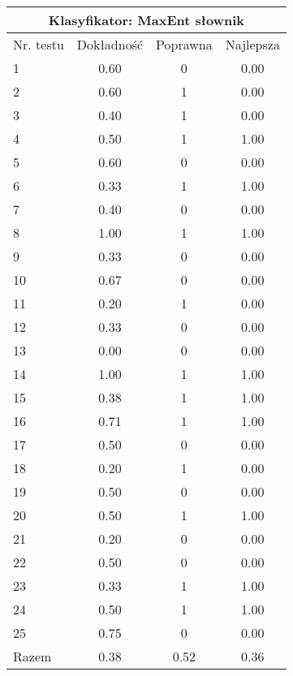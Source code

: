 \documentclass[notitlepage,leqno,fleqn,a4paper]{article}
\begin{document}
\begin{tabular}{|l|c|c|c|}
\hline
\multicolumn{4}{|c|}{Klasyfikator: MaxEnt słownik}\\
\hline
Nr. testu & Dokładność & Poprawna & Najlepsza\\
\hline
1 & 0.60 & 0 & 0.00 \\
2 & 0.60 & 1 & 0.00 \\
3 & 0.40 & 1 & 0.00 \\
4 & 0.50 & 1 & 1.00 \\
5 & 0.60 & 0 & 0.00 \\
6 & 0.33 & 1 & 1.00 \\
7 & 0.40 & 0 & 0.00 \\
8 & 1.00 & 1 & 1.00 \\
9 & 0.33 & 0 & 0.00 \\
10 & 0.67 & 0 & 0.00 \\
11 & 0.20 & 1 & 0.00 \\
12 & 0.33 & 0 & 0.00 \\
13 & 0.00 & 0 & 0.00 \\
14 & 1.00 & 1 & 1.00 \\
15 & 0.38 & 1 & 1.00 \\
16 & 0.71 & 1 & 1.00 \\
17 & 0.50 & 0 & 0.00 \\
18 & 0.20 & 1 & 0.00 \\
19 & 0.50 & 0 & 0.00 \\
20 & 0.50 & 1 & 1.00 \\
21 & 0.20 & 0 & 0.00 \\
22 & 0.50 & 0 & 0.00 \\
23 & 0.33 & 1 & 1.00 \\
24 & 0.50 & 1 & 1.00 \\
25 & 0.75 & 0 & 0.00 \\
\hline
Razem & 0.38 & 0.52 & 0.36 \\
\hline
\end{tabular}
\end{document}
